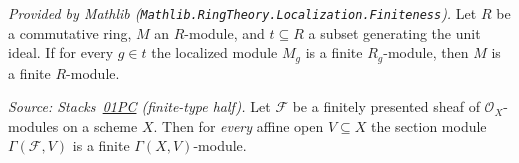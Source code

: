 \begin{lemma}
  \label{lem:module_finite_of_localizationSpan_mathlib}
  \mathlibok
  \textit{Provided by Mathlib
  (\texttt{Mathlib.RingTheory.Localization.Finiteness}).}
  Let \(R\) be a commutative ring, \(M\) an \(R\)-module, and
  \(t \subseteq R\) a subset generating the unit ideal.  If for every
  \(g \in t\) the localized module \(M_g\) is a finite \(R_g\)-module, then
  \(M\) is a finite \(R\)-module.
\end{lemma}

\begin{lemma}\leanok
  \label{lem:finite_sections_affine_all}
  \textit{Source: Stacks~\href{https://stacks.math.columbia.edu/tag/01PC}{01PC}
  (finite-type half).}
  Let \(\mathcal{F}\) be a finitely presented sheaf of
  \(\mathcal{O}_X\)-modules on a scheme \(X\).  Then for \emph{every} affine
  open \(V \subseteq X\) the section module \(\Gamma(\mathcal{F}, V)\) is a
  finite \(\Gamma(X, V)\)-module.
\end{lemma}
